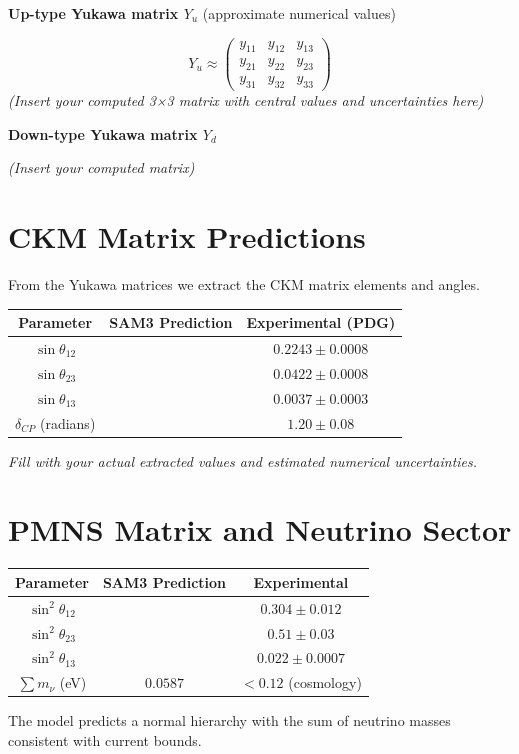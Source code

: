 \documentclass[11pt,a4paper]{article}
\begin{document}
\begin{center}
\textbf{Up-type Yukawa matrix \(Y_u\)} (approximate numerical values)
\end{center}
\begin{equation}
Y_u \approx
\begin{pmatrix}
y_{11} & y_{12} & y_{13} \\
y_{21} & y_{22} & y_{23} \\
y_{31} & y_{32} & y_{33}
\end{pmatrix}
\end{equation}
\textit{(Insert your computed 3×3 matrix with central values and uncertainties here)}

\begin{center}
\textbf{Down-type Yukawa matrix \(Y_d\)}
\end{center}
\textit{(Insert your computed matrix)}

\section{CKM Matrix Predictions}
From the Yukawa matrices we extract the CKM matrix elements and angles.

\begin{center}
\begin{tabular}{c|c|c}
\hline
\textbf{Parameter} & \textbf{SAM3 Prediction} & \textbf{Experimental (PDG)} \\
\hline
\(\sin\theta_{12}\) & & \(0.2243 \pm 0.0008\) \\
\(\sin\theta_{23}\) & & \(0.0422 \pm 0.0008\) \\
\(\sin\theta_{13}\) & & \(0.0037 \pm 0.0003\) \\
\(\delta_{CP}\) (radians) & & \(1.20 \pm 0.08\) \\
\hline
\end{tabular}
\end{center}
\textit{Fill with your actual extracted values and estimated numerical uncertainties.}

\section{PMNS Matrix and Neutrino Sector}
\begin{center}
\begin{tabular}{c|c|c}
\hline
\textbf{Parameter} & \textbf{SAM3 Prediction} & \textbf{Experimental} \\
\hline
\(\sin^2\theta_{12}\) & & \(0.304 \pm 0.012\) \\
\(\sin^2\theta_{23}\) & & \(0.51 \pm 0.03\) \\
\(\sin^2\theta_{13}\) & & \(0.022 \pm 0.0007\) \\
\(\sum m_\nu\) (eV) & \(0.0587\) & \(< 0.12\) (cosmology) \\
\hline
\end{tabular}
\end{center}
The model predicts a normal hierarchy with the sum of neutrino masses consistent with current bounds.
\end{document}
